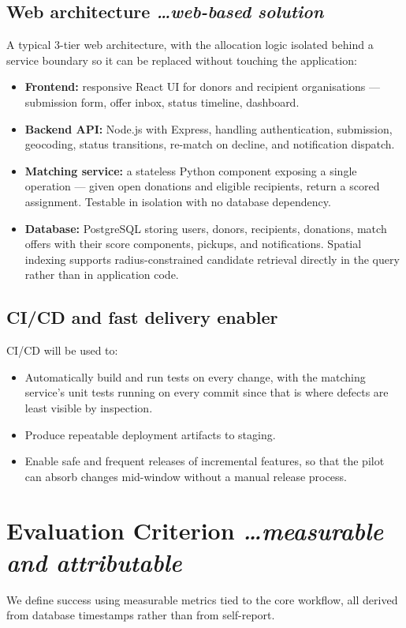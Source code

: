 \documentclass[11pt,a4paper]{article}
\newcommand{\BvrHint}[1]{%
  {\normalfont\normalsize\itshape\hfill #1}}
\begin{document}
\subsection{Web architecture %
\BvrHint{\ldots web-based solution}}
A typical 3-tier web architecture, with the allocation logic isolated behind a service boundary so it can be replaced without touching the application:
\begin{itemize}[leftmargin=0.7cm]
    \item \textbf{Frontend:} responsive React UI for donors and recipient organisations --- submission form, offer inbox, status timeline, dashboard.
    \item \textbf{Backend API:} Node.js with Express, handling authentication, submission, geocoding, status transitions, re-match on decline, and notification dispatch.
    \item \textbf{Matching service:} a stateless Python component exposing a single operation --- given open donations and eligible recipients, return a scored assignment. Testable in isolation with no database dependency.
    \item \textbf{Database:} PostgreSQL storing users, donors, recipients, donations, match offers with their score components, pickups, and notifications. Spatial indexing supports radius-constrained candidate retrieval directly in the query rather than in application code.
\end{itemize}

\subsection{CI/CD and fast delivery enabler}
CI/CD will be used to:
\begin{itemize}[leftmargin=0.7cm]
    \item Automatically build and run tests on every change, with the matching service's unit tests running on every commit since that is where defects are least visible by inspection.
    \item Produce repeatable deployment artifacts to staging.
    \item Enable safe and frequent releases of incremental features, so that the pilot can absorb changes mid-window without a manual release process.
\end{itemize}

\section{Evaluation Criterion %
\BvrHint{\ldots measurable and attributable}}
We define success using measurable metrics tied to the core workflow, all derived from database timestamps rather than from self-report.
\end{document}

